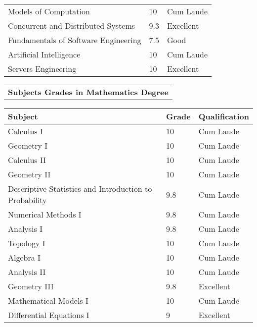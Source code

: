 \documentclass[10pt,a4paper,sans]{moderncv} %
\begin{document}
\begin{center}
\begin{tabular}{L{0.5\textwidth}C{0.2\textwidth}C{0.3\textwidth}}
    		Models of Computation                         & 10   & Cum Laude  \\
    		Concurrent and Distributed Systems            & 9.3  & Excellent   \\
    		Fundamentals of Software Engineering          & 7.5  & Good       \\
    		Artificial Intelligence                       & 10   & Cum Laude  \\
    		Servers Engineering                           & 10   & Excellent  \\
    	\end{tabular}
        \begin{tabular}{C{\textwidth}}
        \toprule
        \textbf{Subjects Grades in Mathematics Degree}
        \end{tabular}
    	\begin{tabular}{L{0.5\textwidth}C{0.2\textwidth}C{0.3\textwidth}}
    		\toprule
    		\textbf{Subject} & \textbf{ Grade } & \textbf{ Qualification}   \\
    		\midrule
    		Calculus I                                              & 10  & Cum Laude  \\
    		Geometry I                                              & 10  & Cum Laude  \\
    		Calculus II                                             & 10  & Cum Laude  \\
    		Geometry II                                             & 10  & Cum Laude  \\
    		Descriptive Statistics and Introduction to Probability  & 9.8 & Cum Laude  \\
    		Numerical Methods I                                     & 9.8 & Cum Laude  \\
    		Analysis I                                              & 9.8 & Cum Laude  \\
    		Topology I                                              & 10  & Cum Laude  \\
    		Algebra I                                               & 10  & Cum Laude  \\
    		Analysis II                                             & 10  & Cum Laude  \\
    		Geometry III                                            & 9.8 & Excellent  \\
    		Mathematical Models I                                   & 10  & Cum Laude  \\
    		Differential Equations I                                & 9   & Excellent  \\

\end{tabular}
\end{center}
\end{document}
